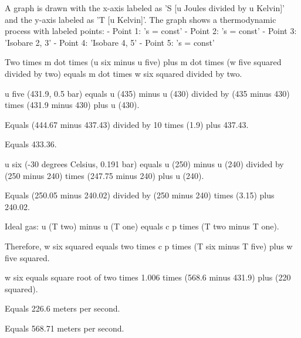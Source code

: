A graph is drawn with the x-axis labeled as 'S [u Joules divided by u Kelvin]' and the y-axis labeled as 'T [u Kelvin]'. The graph shows a thermodynamic process with labeled points:  
- Point 1: 's = const'  
- Point 2: 's = const'  
- Point 3: 'Isobare 2, 3'  
- Point 4: 'Isobare 4, 5'  
- Point 5: 's = const'

Two times m dot times (u six minus u five) plus m dot times (w five squared divided by two) equals m dot times w six squared divided by two.  

u five (431.9, 0.5 bar) equals u (435) minus u (430) divided by (435 minus 430) times (431.9 minus 430) plus u (430).  

Equals (444.67 minus 437.43) divided by 10 times (1.9) plus 437.43.  

Equals 433.36.  

u six (-30 degrees Celsius, 0.191 bar) equals u (250) minus u (240) divided by (250 minus 240) times (247.75 minus 240) plus u (240).  

Equals (250.05 minus 240.02) divided by (250 minus 240) times (3.15) plus 240.02.  

Ideal gas: u (T two) minus u (T one) equals c p times (T two minus T one).  

Therefore, w six squared equals two times c p times (T six minus T five) plus w five squared.  

w six equals square root of two times 1.006 times (568.6 minus 431.9) plus (220 squared).  

Equals 226.6 meters per second.  

Equals 568.71 meters per second.